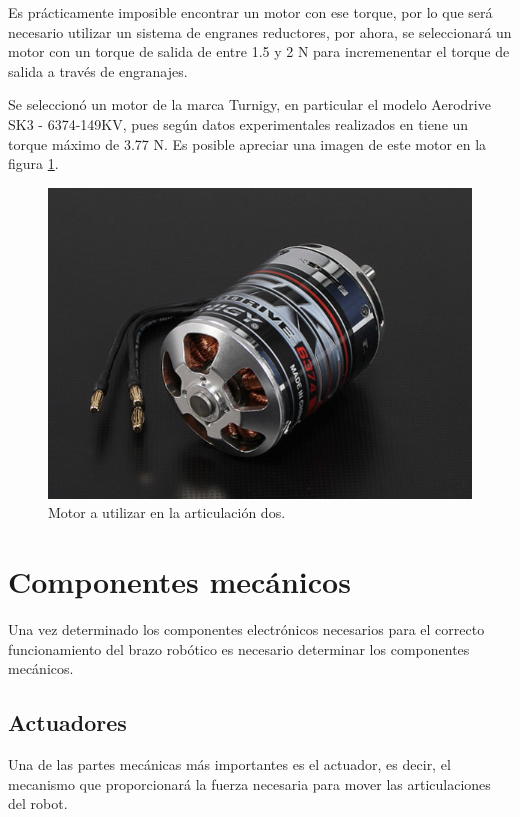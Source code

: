 Es prácticamente imposible encontrar un motor con ese torque, por lo que será necesario utilizar un sistema de engranes reductores, por ahora, se seleccionará un motor con un torque de salida de entre 1.5 y 2 N para incremenentar el torque de salida a través de engranajes.

Se seleccionó un motor de la marca Turnigy, en particular el modelo Aerodrive SK3 - 6374-149KV, pues según datos experimentales realizados en \cite{odrivedoc} tiene un torque máximo de 3.77 N. Es posible apreciar una imagen de este motor en la figura \ref{fig:sk36374}.

\begin{figure}
    \centering
    \includegraphics[scale=0.6]{./img/chapter3/sk36374.jpg}
    \caption{Motor a utilizar en la articulación dos.}
    \label{fig:sk36374}
\end{figure}


\section{Componentes mecánicos}

Una vez determinado los componentes electrónicos necesarios para el correcto funcionamiento del brazo robótico es necesario determinar los componentes mecánicos.

\subsection{Actuadores}

Una de las partes mecánicas más importantes es el actuador, es decir, el mecanismo que proporcionará la fuerza necesaria para mover las articulaciones del robot.

